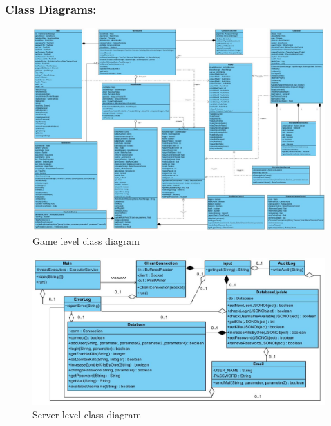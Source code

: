 \documentclass[letterpaper]{article}
\begin{document}
				\vspace{0.2in}
				\subsubsection*{Class Diagrams:}
				\vspace{0.1in}
				
					\begin{figure}[H]
					\centering
					\includegraphics[width=180mm]{UML_Diagram/Class/Game_Classes.jpg}
					\caption{Game level class diagram}
					\label{overflow}
					\end{figure}
					
					\begin{figure}[H]
					\centering
					\includegraphics[width=180mm]{UML_Diagram/Class/Server_Classes.jpg}
					\caption{Server level class diagram}
					\label{overflow}
					\end{figure}
					
\end{document}
